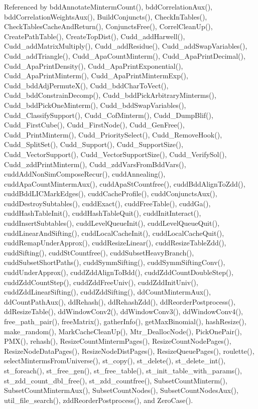 Referenced by bdd\-Annotate\-Minterm\-Count(), bdd\-Correlation\-Aux(), bdd\-Correlation\-Weights\-Aux(), Build\-Conjuncts(), Check\-In\-Tables(), Check\-Tables\-Cache\-And\-Return(), Conjuncts\-Free(), Correl\-Clean\-Up(), Create\-Path\-Table(), Create\-Top\-Dist(), Cudd\_\-add\-Harwell(), Cudd\_\-add\-Matrix\-Multiply(), Cudd\_\-add\-Residue(), Cudd\_\-add\-Swap\-Variables(), Cudd\_\-add\-Triangle(), Cudd\_\-Apa\-Count\-Minterm(), Cudd\_\-Apa\-Print\-Decimal(), Cudd\_\-Apa\-Print\-Density(), Cudd\_\-Apa\-Print\-Exponential(), Cudd\_\-Apa\-Print\-Minterm(), Cudd\_\-Apa\-Print\-Minterm\-Exp(), Cudd\_\-bdd\-Adj\-Permute\-X(), Cudd\_\-bdd\-Char\-To\-Vect(), Cudd\_\-bdd\-Constrain\-Decomp(), Cudd\_\-bdd\-Pick\-Arbitrary\-Minterms(), Cudd\_\-bdd\-Pick\-One\-Minterm(), Cudd\_\-bdd\-Swap\-Variables(), Cudd\_\-Classify\-Support(), Cudd\_\-Cof\-Minterm(), Cudd\_\-Dump\-Blif(), Cudd\_\-First\-Cube(), Cudd\_\-First\-Node(), Cudd\_\-Gen\-Free(), Cudd\_\-Print\-Minterm(), Cudd\_\-Priority\-Select(), Cudd\_\-Remove\-Hook(), Cudd\_\-Split\-Set(), Cudd\_\-Support(), Cudd\_\-Support\-Size(), Cudd\_\-Vector\-Support(), Cudd\_\-Vector\-Support\-Size(), Cudd\_\-Verify\-Sol(), Cudd\_\-zdd\-Print\-Minterm(), Cudd\_\-zdd\-Vars\-From\-Bdd\-Vars(), cudd\-Add\-Non\-Sim\-Compose\-Recur(), cudd\-Annealing(), cudd\-Apa\-Count\-Minterm\-Aux(), cudd\-Apa\-St\-Countfree(), cudd\-Bdd\-Align\-To\-Zdd(), cudd\-Bdd\-LICMark\-Edges(), cudd\-Cache\-Profile(), cudd\-Conjuncts\-Aux(), cudd\-Destroy\-Subtables(), cudd\-Exact(), cudd\-Free\-Table(), cudd\-Ga(), cudd\-Hash\-Table\-Init(), cudd\-Hash\-Table\-Quit(), cudd\-Init\-Interact(), cudd\-Insert\-Subtables(), cudd\-Level\-Queue\-Init(), cudd\-Level\-Queue\-Quit(), cudd\-Linear\-And\-Sifting(), cudd\-Local\-Cache\-Init(), cudd\-Local\-Cache\-Quit(), cudd\-Remap\-Under\-Approx(), cudd\-Resize\-Linear(), cudd\-Resize\-Table\-Zdd(), cudd\-Sifting(), cudd\-St\-Countfree(), cudd\-Subset\-Heavy\-Branch(), cudd\-Subset\-Short\-Paths(), cudd\-Symm\-Sifting(), cudd\-Symm\-Sifting\-Conv(), cudd\-Under\-Approx(), cudd\-Zdd\-Align\-To\-Bdd(), cudd\-Zdd\-Count\-Double\-Step(), cudd\-Zdd\-Count\-Step(), cudd\-Zdd\-Free\-Univ(), cudd\-Zdd\-Init\-Univ(), cudd\-Zdd\-Linear\-Sifting(), cudd\-Zdd\-Sifting(), dd\-Count\-Minterm\-Aux(), dd\-Count\-Path\-Aux(), dd\-Rehash(), dd\-Rehash\-Zdd(), dd\-Reorder\-Postprocess(), dd\-Resize\-Table(), dd\-Window\-Conv2(), dd\-Window\-Conv3(), dd\-Window\-Conv4(), free\_\-path\_\-pair(), free\-Matrix(), gather\-Info(), get\-Max\-Binomial(), hash\-Resize(), make\_\-random(), Mark\-Cache\-Clean\-Up(), Mtr\_\-Dealloc\-Node(), Pick\-One\-Pair(), PMX(), rehash(), Resize\-Count\-Minterm\-Pages(), Resize\-Count\-Node\-Pages(), Resize\-Node\-Data\-Pages(), Resize\-Node\-Dist\-Pages(), Resize\-Queue\-Pages(), roulette(), select\-Minterms\-From\-Universe(), st\_\-copy(), st\_\-delete(), st\_\-delete\_\-int(), st\_\-foreach(), st\_\-free\_\-gen(), st\_\-free\_\-table(), st\_\-init\_\-table\_\-with\_\-params(), st\_\-zdd\_\-count\_\-dbl\_\-free(), st\_\-zdd\_\-countfree(), Subset\-Count\-Minterm(), Subset\-Count\-Minterm\-Aux(), Subset\-Count\-Nodes(), Subset\-Count\-Nodes\-Aux(), util\_\-file\_\-search(), zdd\-Reorder\-Postprocess(), and Zero\-Case().
